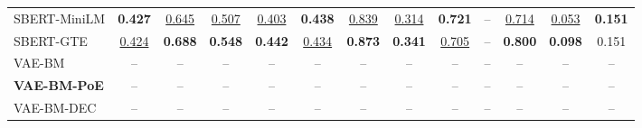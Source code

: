 \begin{table}[t]
{\begin{tabular}{lcccccccccccc}
SBERT-MiniLM & \textbf{0.427} & \underline{0.645} & \underline{0.507} & \underline{0.403} & \textbf{0.438} & \underline{0.839} & \underline{0.314} & \textbf{0.721} & -- & \underline{0.714} & \underline{0.053} & \textbf{0.151} \\
SBERT-GTE & \underline{0.424} & \textbf{0.688} & \textbf{0.548} & \textbf{0.442} & \underline{0.434} & \textbf{0.873} & \textbf{0.341} & \underline{0.705} & -- & \textbf{0.800} & \textbf{0.098} & 0.151 \\
\midrule
VAE-BM & -- & -- & -- & -- & -- & -- & -- & -- & -- & -- & -- & -- \\
\textbf{VAE-BM-PoE} & -- & -- & -- & -- & -- & -- & -- & -- & -- & -- & -- & -- \\
VAE-BM-DEC & -- & -- & -- & -- & -- & -- & -- & -- & -- & -- & -- & -- \\
\bottomrule
\end{tabular}
}
\end{table}
